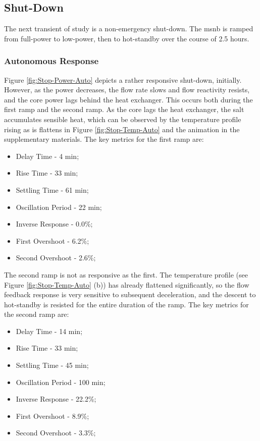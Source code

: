 \subsection{Shut-Down}
The next transient of study is a non-emergency shut-down. The \acs{msnb} is ramped from full-power to low-power, then to hot-standby over the course of 2.5 hours. 

\subsubsection{Autonomous Response}
Figure \ref{fig:Stop-Power-Auto} depicts a rather responsive shut-down, initially. However, as the power decreases, the flow rate slows and flow reactivity resists, and the core power lags behind the heat exchanger. This occurs both during the first ramp and the second ramp. As the core lags the heat exchanger, the salt accumulates sensible heat, which can be observed by the temperature profile rising as is flattens in Figure \ref{fig:Stop-Temp-Auto} and the animation in the supplementary materials\footnotemark[2]. The key metrics for the first ramp are:

\begin{itemize}
    \item Delay Time - 4 min;
    \item Rise Time - 33 min;
    \item Settling Time - 61 min;
    \item Oscillation Period - 22 min;
    \item Inverse Response - 0.0\%;
    \item First Overshoot - 6.2\%;
    \item Second Overshoot -  2.6\%;
\end{itemize}

The second ramp is not as responsive as the first. The temperature profile (see Figure \ref{fig:Stop-Temp-Auto} (b)) has already flattened significantly, so the flow feedback response is very sensitive to subsequent deceleration, and the descent to hot-standby is resisted for the entire duration of the ramp.  The key metrics for the second ramp are:

\begin{itemize}
    \item Delay Time - 14 min;
    \item Rise Time - 33 min;
    \item Settling Time - 45 min;
    \item Oscillation Period - 100 min;
    \item Inverse Response - 22.2\%;
    \item First Overshoot - 8.9\%;
    \item Second Overshoot -  3.3\%;
\end{itemize}

